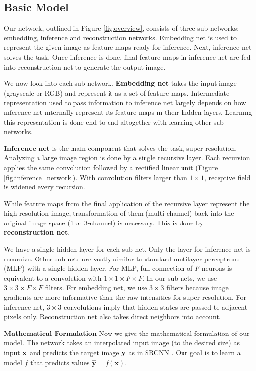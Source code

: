 \documentclass[10pt,twocolumn,letterpaper]{article}
\begin{document}
\subsection{Basic Model}

Our network, outlined in Figure \ref{fig:overview}, consists of three sub-networks: embedding, inference and reconstruction networks. Embedding net is used to represent the given image as feature maps ready for inference. Next, inference net solves the task. Once inference is done, final feature maps in inference net are fed into reconstruction net to generate the output image.

We now look into each sub-network. \textbf{Embedding net} takes the input image (grayscale or RGB) and represent it as a set of feature maps. Intermediate representation used to pass information to inference net largely depends on how inference net internally represent its feature maps in their hidden layers. Learning this representation is done end-to-end altogether with learning other sub-networks.


\textbf{Inference net} is the main component that solves the task, super-resolution. Analyzing a large image region is done by a single recursive layer. Each recursion applies the same convolution followed by a rectified linear unit (Figure \ref{fig:inference_network}). With convolution filters larger than $1\times 1$,  receptive field is widened every recursion.   

While feature maps from the final application of the recursive layer represent the high-resolution image, transformation of them (multi-channel) back into the original image space (1 or 3-channel) is necessary. This is done by \textbf{reconstruction net}.  

We have a single hidden layer for each sub-net. Only the layer for inference net is recursive. Other sub-nets are vastly similar to standard mutilayer perceptrons (MLP) with a single hidden layer. For MLP, full connection of $F$ neurons is equivalent to a convolution with $1\times 1\times F \times F$. In our sub-nets, we use $3\times 3\times F \times F$ filters. For embedding net, we use $3\times 3$ filters because image gradients are more informative than the raw intensities for super-resolution. For inference net, $3\times 3$ convolutions imply that hidden states are passed to adjacent pixels only. Reconstruction net also takes direct neighbors into account.

\textbf{Mathematical Formulation} Now we give the mathematical formulation of our model. The network takes an interpolated input image (to the desired size) as input ${\bf x}$ and predicts the target image ${\bf y}$ as in SRCNN \cite{dong2014image}. Our goal is to learn a model $f$ that predicts values $\mathbf{\hat{y}}=f(\mathbf{x})$.  
\end{document}
